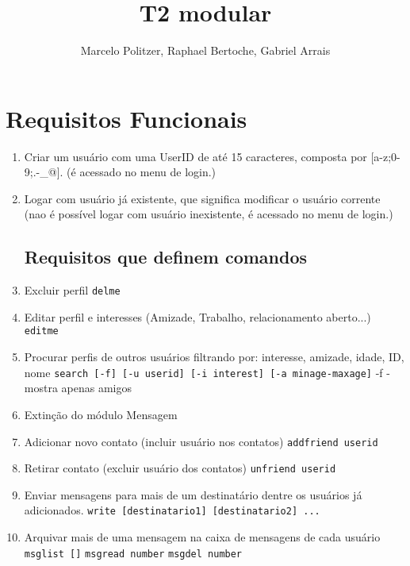 \documentclass[a4paper,8pt]{article}
\title{T2 modular}
\author{Marcelo Politzer, Raphael Bertoche, Gabriel Arrais}
\begin{document}
\maketitle

\tableofcontents
\section{Requisitos Funcionais}


\begin{enumerate}
\item Criar um usuário com uma UserID de até 15 caracteres, composta por
	[a-z;0-9;.-\_@]. (é acessado no menu de login.)

\item Logar com usuário já existente, que significa modificar o usuário
	corrente (nao é possível logar com usuário inexistente, é acessado no menu
	de login.)

\subsection{Requisitos que definem comandos}
\item Excluir perfil
	\newline\texttt{delme}

\item Editar perfil e interesses (Amizade, Trabalho, relacionamento aberto...)
	\newline\texttt{editme}

\item Procurar perfis de outros usuários filtrando por: interesse, amizade,
	idade, ID, nome
	\newline\texttt{search [-f] [-u userid] [-i interest] [-a minage-maxage]}
	\newline-f - mostra apenas amigos
\item Extinção do módulo Mensagem

\item Adicionar novo contato (incluir usuário nos contatos)
	\newline\texttt{addfriend userid}

\item Retirar contato (excluir usuário dos contatos)
	\newline\texttt{unfriend userid}

\item Enviar mensagens para mais de um destinatário dentre os usuários já
	adicionados.
	\newline\texttt{write [destinatario1] [destinatario2] ...}

\item Arquivar mais de uma mensagem na caixa de mensagens de cada usuário
	\newline\texttt{msglist []}
	\newline\texttt{msgread number}
	\newline\texttt{msgdel number}

\end{enumerate}
\end{document}
